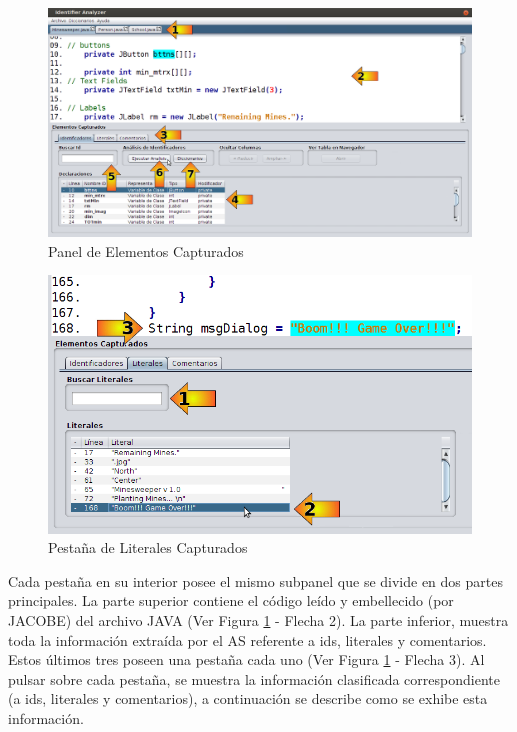 \begin{figure}[t!] %
\centerline{%
\includegraphics[scale= 0.42]{./cap4/ida_03.png}
}
\caption{Panel de Elementos Capturados}
\label{ida3}
\end{figure}

\begin{figure}[h!] %
\centerline{%
\includegraphics[scale= 0.5]{./cap4/ida_04.png}
}
\caption{Pestaña de Literales Capturados}
\label{ida4}
\end{figure}

Cada pestaña en su interior posee el mismo subpanel que se divide en dos partes principales. La parte superior contiene el código leído y embellecido (por JACOBE) del archivo JAVA (Ver Figura \ref{ida3} - Flecha 2).
La parte inferior, muestra toda la información extraída por el AS referente a ids, literales y comentarios. Estos últimos tres poseen una pestaña cada uno (Ver Figura \ref{ida3} - Flecha 3). Al pulsar sobre cada pestaña, se muestra la información clasificada correspondiente (a ids, literales y comentarios), a continuación se describe como se exhibe esta información.

